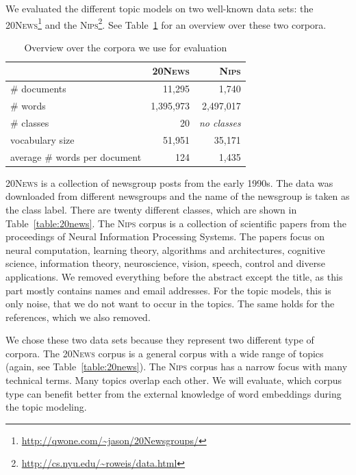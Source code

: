 \documentclass[
        a4paper,
        titlepage,
        twoside,
        parskip,
        numbers=noenddot
        ]{scrbook}
\newcommand{\ra}[1]{\renewcommand{\arraystretch}{#1}}
\theoremstyle{break}
\begin{document}
We evaluated the different topic models on two well-known data sets: the \textsc{20News}\footnote{\url{http://qwone.com/~jason/20Newsgroups/}} and the \textsc{Nips}\footnote{\url{http://cs.nyu.edu/~roweis/data.html}}.
See Table~\ref{table:data_sets} for an overview over these two corpora.
\begin{table}[]
  \ra{1.3}
  \centering
  \caption{Overview over the corpora we use for evaluation}
  \label{table:data_sets}
  \begin{tabular}{@{}lrr@{}}
    \toprule
                               & \textsc{20News} & \textsc{Nips}                \\ \midrule
                               \# documents                  & 11,295            & 1,740               \\
                               \# words                      & 1,395,973         & 2,497,017           \\
                               \# classes                    & 20                & \textit{no classes} \\
                               vocabulary size               & 51,951            & 35,171              \\
                               average \# words per document & 124               & 1,435               \\
                               \bottomrule
  \end{tabular}
\end{table}
\textsc{20News} is a collection of newsgroup posts from the early 1990s.
The data was downloaded from different newsgroups and the name of the newsgroup is taken as the class label.
There are twenty different classes, which are shown in Table~\ref{table:20news}.
The \textsc{Nips} corpus is a collection of scientific papers from the proceedings of Neural Information Processing Systems.
The papers focus on neural computation, learning theory, algorithms and architectures, cognitive science, information theory, neuroscience, vision, speech, control and diverse applications.
We removed everything before the abstract except the title, as this part mostly contains names and email addresses.
For the topic models, this is only noise, that we do not want to occur in the topics.
The same holds for the references, which we also removed.

We chose these two data sets because they represent two different type of corpora.
The \textsc{20News} corpus is a general corpus with a wide range of topics (again, see Table~\ref{table:20news}).
The \textsc{Nips} corpus has a narrow focus with many technical terms.
Many topics overlap each other.
We will evaluate, which corpus type can benefit better from the external knowledge of word embeddings during the topic modeling.
\end{document}
